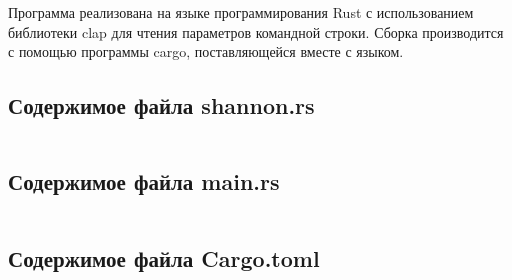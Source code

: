 \documentclass[a4paper,oneside]{article}
\theoremstyle{definition}
\begin{document}
Программа реализована на языке программирования Rust с использованием библиотеки
clap для чтения параметров командной строки. Сборка производится с помощью
программы cargo, поставляющейся вместе с языком.

\subsection{Содержимое файла shannon.rs}
\inputminted{rust}{../../lab3/src/shannon.rs}

\subsection{Содержимое файла main.rs}
\inputminted{rust}{../../lab3/src/main.rs}

\subsection{Содержимое файла Cargo.toml}
\inputminted{toml}{../../lab3/Cargo.toml}
\end{document}
